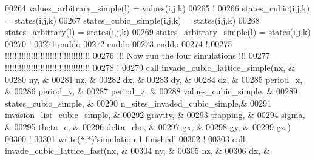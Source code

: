 \begin{DoxyCode}
00264          values\_arbitrary\_simple(l) = values(i,j,k)
00265          \textcolor{comment}{!}
00266          states\_cubic(i,j,k) = states(i,j,k)
00267          states\_cubic\_simple(i,j,k) = states(i,j,k)
00268          states\_arbitrary(l) = states(i,j,k)
00269          states\_arbitrary\_simple(l) = states(i,j,k)
00270          \textcolor{comment}{!}
00271       \textcolor{keyword}{enddo}
00272    \textcolor{keyword}{enddo}
00273 \textcolor{keyword}{enddo}
00274 \textcolor{comment}{!}
00275 \textcolor{comment}{!!!!!!!!!!!!!!!!!!!!!!!!!!!!!!!!!!!!}
00276 \textcolor{comment}{!!! Now run the four simulations !!!}
00277 \textcolor{comment}{!!!!!!!!!!!!!!!!!!!!!!!!!!!!!!!!!!!!}
00278 \textcolor{comment}{!}
00279 call invade\_cubic\_lattice\_simple(nx,                          &
00280                                  ny,                          &
00281                                  nz,                          &
00282                                  dx,                          &
00283                                  dy,                          &
00284                                  dz,                          &
00285                                  period\_x,                    &
00286                                  period\_y,                    &
00287                                  period\_z,                    &
00288                                  values\_cubic\_simple,         &
00289                                  states\_cubic\_simple,         &
00290                                  n\_sites\_invaded\_cubic\_simple,&
00291                                  invasion\_list\_cubic\_simple,  &
00292                                  gravity,                     &
00293                                  trapping,                    &
00294                                  sigma,                       &
00295                                  theta\_c,                     &
00296                                  delta\_rho,                   &
00297                                  gx,                          &
00298                                  gy,                          &
00299                                  gz                           )
00300 \textcolor{comment}{!}
00301 \textcolor{keyword}{write}(*,*)\textcolor{stringliteral}{'simulation 1 finished'}
00302 \textcolor{comment}{! }
00303 call invade\_cubic\_lattice\_fast(nx,                    &
00304                                ny,                    &
00305                                nz,                    &
00306                                dx,                    &

\end{DoxyCode}
